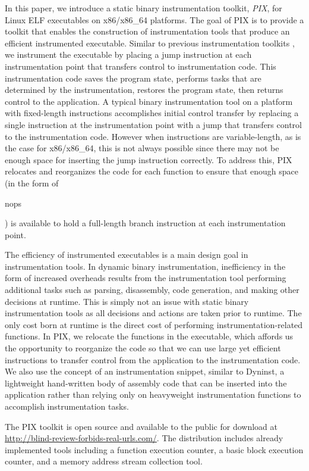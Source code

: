 In this paper, we introduce a static binary instrumentation toolkit, \textit{PIX}, for Linux ELF executables on
x86/x86\_64 platforms. The goal of PIX is to provide a toolkit that enables the construction of
instrumentation tools that produce an efficient instrumented
executable. Similar to previous instrumentation toolkits \cite{buck2000api}, we instrument the executable 
by placing a jump instruction at each instrumentation
point that transfers control to instrumentation code. This instrumentation code saves the
program state, performs tasks that are determined by the instrumentation,
restores the program state, then returns control to the application.
A typical binary instrumentation tool on a platform with fixed-length instructions 
\cite{tikir2006pmac} accomplishes initial control transfer by replacing a
single instruction at the instrumentation point with a jump that transfers
control to the instrumentation code. However when instructions are variable-length, as
is the case for x86/x86\_64, this is not always possible since there may not be enough space for 
inserting the jump instruction correctly. To address this, PIX
relocates and reorganizes the code for each function to ensure that enough
space (in the form of \begin{it}nops\end{it}) is available to hold a full-length branch instruction at each
instrumentation point.

The efficiency of instrumented executables is a main design goal in instrumentation tools. In dynamic binary instrumentation,
inefficiency in the form of increased overheads results from the instrumentation tool performing additional tasks such 
as parsing, disassembly, code generation, and making other decisions at runtime. This
is simply not an issue with static binary instrumentation tools as all
decisions and actions are taken prior to runtime. The only cost born at runtime is the direct
cost of performing instrumentation-related functions. In PIX, we relocate the 
functions in the executable, which affords us the opportunity to reorganize the code so that we
can use large yet efficient instructions to transfer control from the
application to the instrumentation code. We also use the concept of an
instrumentation snippet, similar to Dyninst, a lightweight hand-written body of assembly code that can
be inserted into the application rather than relying only on heavyweight
instrumentation functions to accomplish instrumentation tasks.

The PIX toolkit is open source and available to the public for download 
at \url{http://blind-review-forbids-real-urls.com/}. The distribution includes already implemented tools 
including a function execution counter, a basic block
execution counter, and a memory address stream collection tool.

